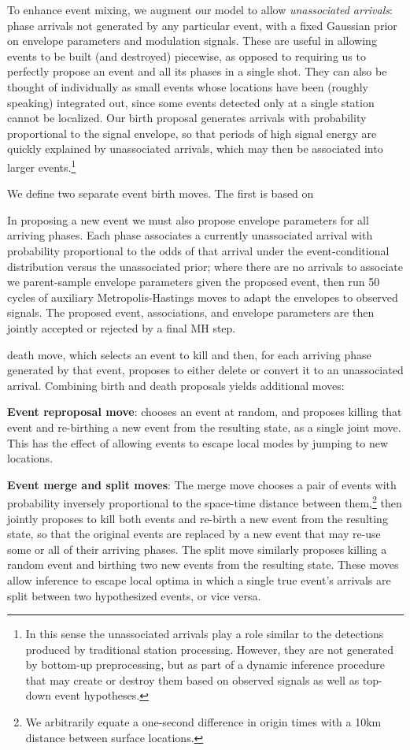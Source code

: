 \documentclass[twoside]{article} \usepackage{aistats2017}
\begin{document}
To enhance event mixing, we augment our model to allow {\em unassociated
  arrivals}: phase arrivals not generated by any particular event, with a fixed Gaussian prior on envelope parameters and modulation signals. These are useful in allowing events to be built
(and destroyed) piecewise, as opposed to requiring us to perfectly
propose an event and all its phases in a single shot. They can also be
thought of individually as small events whose locations have been
(roughly speaking) integrated out, since some events detected only
at a single station cannot be localized. Our birth
proposal generates arrivals with probability proportional
to the signal envelope, so that periods of high signal energy are
quickly explained by unassociated arrivals, which may then be
associated into larger events.\footnote{In this sense the unassociated
arrivals play a role similar to the detections produced by traditional
station processing. However, they are not generated by bottom-up
preprocessing, but as part of a dynamic inference procedure that may
create or destroy them based on observed signals as well as top-down
event hypotheses.}

We define two separate event birth moves. The first is based on 



In proposing a
new event we must also propose envelope parameters for all arriving
phases. Each phase associates a currently unassociated arrival with
probability proportional to the odds of that arrival under the
event-conditional distribution versus the unassociated prior; where
there are no arrivals to associate we parent-sample envelope parameters given the proposed
event, then run 50 cycles of auxiliary Metropolis-Hastings moves
\citep{storchak2012} to adapt the envelopes to observed signals. The
proposed event, associations, and envelope parameters are then jointly accepted or
rejected by a final MH step. 

death move, which selects an event to
kill and then, for each arriving phase generated by that event,
proposes to either delete or convert it to an unassociated
arrival. Combining birth and death proposals yields additional moves:

\textbf{Event reproposal move}: chooses an event at random, and
  proposes killing that event and re-birthing a new event from
  the resulting state, as a single joint move. This has the effect of allowing events to
  escape local modes by jumping to new locations.

\textbf{Event merge and split moves}: The merge move chooses a pair of events with probability inversely
  proportional to the space-time distance between them,\footnote{We
    arbitrarily equate a one-second difference in origin times with a 10km
    distance between surface locations.} then jointly proposes to kill
  both events and re-birth a new event from the resulting
  state, so that the original events are replaced by a new event that
  may re-use some or all of their arriving phases. The split move
  similarly proposes killing a random event and birthing two new
  events from the resulting state. These moves allow inference to
  escape local optima in which a single true event's arrivals are split
  between two hypothesized events, or vice versa. 
\end{document}
